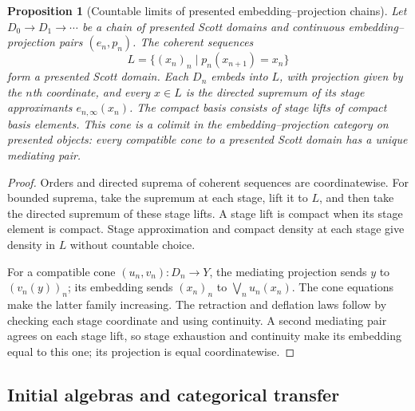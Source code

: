 \documentclass[11pt,a4paper]{article}
\newtheorem{proposition}[theorem]{Proposition}
\theoremstyle{definition}
\theoremstyle{remark}
\newcommand{\lub}{\bigvee}
\begin{document}
\begin{proposition}[Countable limits of presented embedding--projection chains]
Let $D_0\to D_1\to\cdots$ be a chain of presented Scott domains and
continuous embedding--projection pairs $(e_n,p_n)$. The coherent sequences
\[
 L=\{(x_n)_n\mid p_n(x_{n+1})=x_n\}
\]
form a presented Scott domain. Each $D_n$ embeds into $L$, with projection
given by the $n$th coordinate, and every $x\in L$ is the directed supremum
of its stage approximants $e_{n,\infty}(x_n)$. The compact basis consists of
stage lifts of compact basis elements. This cone is a colimit in the
embedding--projection category on presented objects: every compatible
cone to a presented Scott domain has a unique mediating pair.
\end{proposition}
\begin{proof}
Orders and directed suprema of coherent sequences are coordinatewise.
For bounded suprema, take the supremum at each stage, lift it to $L$,
and then take the directed supremum of these stage lifts. A stage lift is
compact when its stage element is compact. Stage approximation and compact
density at each stage give density in $L$ without countable choice.

For a compatible cone $(u_n,v_n):D_n\to Y$, the mediating projection sends
$y$ to $(v_n(y))_n$; its embedding sends $(x_n)_n$ to
$\lub_n u_n(x_n)$. The cone equations make the latter family increasing.
The retraction and deflation laws follow by checking each stage coordinate
and using continuity. A second mediating pair agrees on each stage lift,
so stage exhaustion and continuity make its embedding equal to this one;
its projection is equal coordinatewise.

\end{proof}

\subsection{Initial algebras and categorical transfer}
\end{document}
